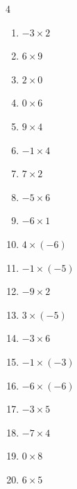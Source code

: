 \begin{multicols}{4}
\begin{enumerate}
  \item $-3\times 2$
        \phantom{$=-6$}

  \item $6\times 9$
        \phantom{$=54$}

  \item $2\times 0$
        \phantom{$=0$}

  \item $0\times 6$
        \phantom{$=0$}

  \item $9\times 4$
        \phantom{$=36$}

  \item $-1\times 4$
        \phantom{$=-4$}

  \item $7\times 2$
        \phantom{$=14$}

  \item $-5\times 6$
        \phantom{$=-30$}

  \item $-6\times 1$
        \phantom{$=-6$}

  \item $4\times (-6)$
        \phantom{$=-24$}

  \item $-1\times (-5)$
        \phantom{$=5$}

\columnbreak %

\resetques

  \item $-9\times 2$
        \phantom{$=-18$}

  \item $3\times (-5)$
        \phantom{$=-15$}

  \item $-3\times 6$
        \phantom{$=-18$}

  \item $-1\times (-3)$
        \phantom{$=3$}

  \item $-6\times (-6)$
        \phantom{$=36$}

  \item $-3\times 5$
        \phantom{$=-15$}

  \item $-7\times 4$
        \phantom{$=-28$}

  \item $0\times 8$
        \phantom{$=0$}

  \item $6\times 5$
        \phantom{$=30$}


\end{enumerate}
\end{multicols}
